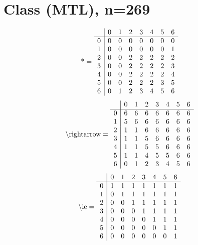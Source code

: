 \documentclass[11pt]{article}
\begin{document}
\section{Class (MTL), n=269}
\[\text{*} = 
\begin{array}{r | r r r r r r r}
 & 0 & 1 & 2 & 3 & 4 & 5 & 6 \\ \hline
0 & 0 & 0 & 0 & 0 & 0 & 0 & 0 \\
1 & 0 & 0 & 0 & 0 & 0 & 0 & 1 \\
2 & 0 & 0 & 2 & 2 & 2 & 2 & 2 \\
3 & 0 & 0 & 2 & 2 & 2 & 2 & 3 \\
4 & 0 & 0 & 2 & 2 & 2 & 2 & 4 \\
5 & 0 & 0 & 2 & 2 & 2 & 3 & 5 \\
6 & 0 & 1 & 2 & 3 & 4 & 5 & 6 \\
\end{array}
\]
\[\text{\textbackslash rightarrow} = 
\begin{array}{r | r r r r r r r}
 & 0 & 1 & 2 & 3 & 4 & 5 & 6 \\ \hline
0 & 6 & 6 & 6 & 6 & 6 & 6 & 6 \\
1 & 5 & 6 & 6 & 6 & 6 & 6 & 6 \\
2 & 1 & 1 & 6 & 6 & 6 & 6 & 6 \\
3 & 1 & 1 & 5 & 6 & 6 & 6 & 6 \\
4 & 1 & 1 & 5 & 5 & 6 & 6 & 6 \\
5 & 1 & 1 & 4 & 5 & 5 & 6 & 6 \\
6 & 0 & 1 & 2 & 3 & 4 & 5 & 6 \\
\end{array}
\]
\[\text{\textbackslash le} = 
\begin{array}{r | r r r r r r r}
 & 0 & 1 & 2 & 3 & 4 & 5 & 6 \\ \hline
0 & 1 & 1 & 1 & 1 & 1 & 1 & 1 \\
1 & 0 & 1 & 1 & 1 & 1 & 1 & 1 \\
2 & 0 & 0 & 1 & 1 & 1 & 1 & 1 \\
3 & 0 & 0 & 0 & 1 & 1 & 1 & 1 \\
4 & 0 & 0 & 0 & 0 & 1 & 1 & 1 \\
5 & 0 & 0 & 0 & 0 & 0 & 1 & 1 \\
6 & 0 & 0 & 0 & 0 & 0 & 0 & 1 \\
\end{array}
\]
\end{document}
